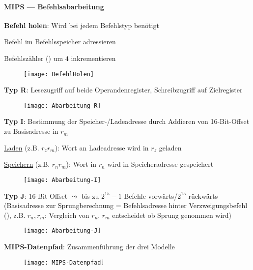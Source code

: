 \paragraph{MIPS  --- Befehlsabarbeitung}
\begin{items}
  \item \textbf{Befehl holen}: Wird bei jedem Befehlstyp benötigt
  \begin{enumeration}
    \item Befehl im Befehlsspeicher adressieren
    \item Befehlszähler () um \( 4 \) inkrementieren
  \end{enumeration}
  \begin{figure}[H]\centering\label{BefehlHolen}\texttt{[image: BefehlHolen]}\end{figure}

  \item \textbf{Typ R}: Lesezugriff auf beide Operandenregister, Schreibzugriff auf Zielregister
  \begin{figure}[H]\centering\label{Abarbeitung-R}\texttt{[image: Abarbeitung-R]}\end{figure}

  \item \textbf{Typ I}: Bestimmung der Speicher-/Ladeadresse durch Addieren von 16-Bit-Offset zu Basisadresse in \( r_m \)
  \begin{enumeration}
    \item \underline{Laden} (z.B.  \( r_z \)\( r_m \)\code{)}): Wort an Ladeadresse wird in \( r_z \) geladen
    \item \underline{Speichern} (z.B.  \( r_n \)\( r_m \)\code{)}): Wort in \( r_n \) wird in Speicheradresse gespeichert
  \end{enumeration}
  \begin{figure}[H]\centering\label{Abarbeitung-I}\texttt{[image: Abarbeitung-I]}\end{figure}

  \item \textbf{Typ J}: 16-Bit Offset \( \leadsto \) bis zu \( 2^{15}-1 \) Befehle vorwärts/\( 2^{15} \) rückwärts (Basisadresse zur Sprungberechnung = Befehlsadresse hinter Verzweigungsbefehl (), z.B.  \( r_n, r_m \): Vergleich von \( r_n \), \( r_m \) entscheidet ob Sprung genommen wird)
  \begin{figure}[H]\centering\label{Abarbeitung-J}\texttt{[image: Abarbeitung-J]}\end{figure}

  \newpage

  \item \textbf{MIPS-Datenpfad}: Zusammenführung der drei Modelle
  \begin{figure}[H]\centering\label{MIPS-Datenpfad}\texttt{[image: MIPS-Datenpfad]}\end{figure}
\end{items}

